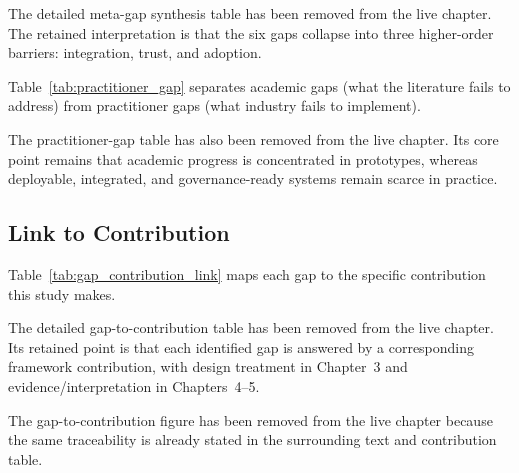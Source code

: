 \noindent The detailed meta-gap synthesis table has been removed from the live chapter. The retained interpretation is that the six gaps collapse into three higher-order barriers: integration, trust, and adoption.


Table~\ref{tab:practitioner_gap} separates academic gaps (what the literature fails to address) from practitioner gaps (what industry fails to implement).

\noindent The practitioner-gap table has also been removed from the live chapter. Its core point remains that academic progress is concentrated in prototypes, whereas deployable, integrated, and governance-ready systems remain scarce in practice.

\subsection{Link to Contribution}

Table~\ref{tab:gap_contribution_link} maps each gap to the specific contribution this study makes.

\noindent The detailed gap-to-contribution table has been removed from the live chapter. Its retained point is that each identified gap is answered by a corresponding framework contribution, with design treatment in Chapter~3 and evidence/interpretation in Chapters~4--5.

The gap-to-contribution figure has been removed from the live chapter because the same traceability is already stated in the surrounding text and contribution table.

